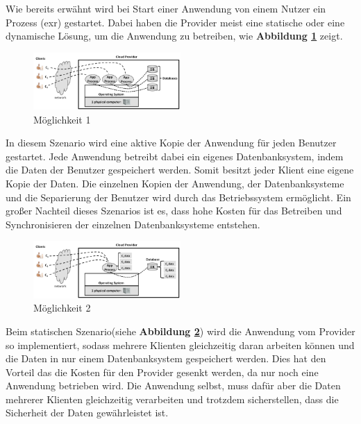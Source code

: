 Wie bereits erwähnt wird bei Start einer Anwendung von einem Nutzer ein Prozess (exr) gestartet. Dabei haben die Provider meist eine statische oder eine dynamische
Lösung, um die Anwendung zu betreiben, wie \textbf{Abbildung \ref{SaaSM1}} zeigt.
\begin{figure}[h]
    \centering
	\includegraphics[width=0.5\textwidth]{Images/SaaSM1}
	\caption{Möglichkeit 1 \cite{Badger}}
	\label{SaaSM1}
\end{figure}
In diesem Szenario wird eine aktive Kopie der Anwendung für jeden Benutzer gestartet. Jede Anwendung betreibt dabei ein eigenes Datenbanksystem, indem die Daten der Benutzer gespeichert werden.
Somit besitzt jeder Klient eine eigene Kopie der Daten. Die einzelnen Kopien der Anwendung, der Datenbanksysteme und die Separierung der Benutzer wird durch das Betriebssystem ermöglicht.
Ein großer Nachteil dieses Szenarios ist es, dass hohe Kosten für das Betreiben und Synchronisieren der einzelnen Datenbanksysteme entstehen.
\begin{figure}[h]
    \centering
	\includegraphics[width=0.5\textwidth]{Images/SaaSM2}
	\caption{Möglichkeit 2 \cite{Badger}}
	\label{SaaSM2}
\end{figure}
Beim statischen Szenario(siehe \textbf{Abbildung \ref{SaaSM2}}) wird die Anwendung vom Provider so implementiert, sodass mehrere Klienten gleichzeitig daran arbeiten können und die Daten in nur einem Datenbanksystem gespeichert werden. 
Dies hat den Vorteil das die Kosten für den Provider gesenkt werden, da nur noch eine Anwendung betrieben wird.
Die Anwendung selbst, muss dafür aber die Daten mehrerer Klienten gleichzeitig verarbeiten und trotzdem sicherstellen, dass die Sicherheit der Daten gewährleistet ist. \cite{Badger}

